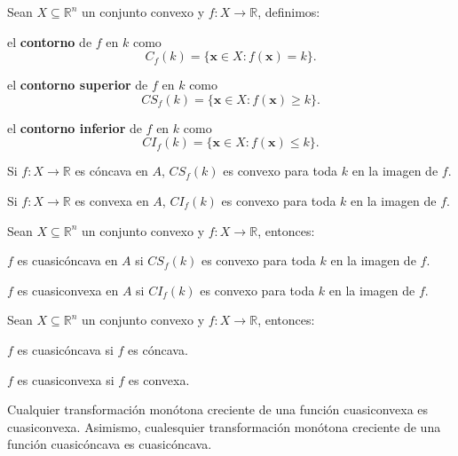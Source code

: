 \documentclass[8pt,a4paper]{extarticle}
\begin{document}
\begin{multicols}{3}
	\begin{boxdef}
		Sean $X \subseteq \mathbb{R}^n$ un conjunto convexo y $f : X \to \mathbb{R}$, definimos:
		\begin{bulletlist}
			\item el \textbf{contorno} de $f$ en $k$ como $$C_f(k) = \{\mathbf{x} \in X : f(\mathbf{x}) = k\}.$$
			\item el \textbf{contorno superior} de $f$ en $k$ como $$CS_f(k) = \{\mathbf{x} \in X : f(\mathbf{x}) \ge k\}.$$
			\item el \textbf{contorno inferior} de $f$ en $k$ como $$CI_f(k) = \{\mathbf{x} \in X : f(\mathbf{x}) \le k\}.$$
		\end{bulletlist}
	\end{boxdef}

	\begin{boxtheo}[]
		\begin{eqlist}
			\item Si $f : X \to \mathbb{R}$ es cóncava en $A$, $CS_f(k)$ es convexo para toda $k$ en la imagen de $f$.
			\item Si $f : X \to \mathbb{R}$ es convexa en $A$, $CI_f(k)$ es convexo para toda $k$ en la imagen de $f$.
		\end{eqlist}
	\end{boxtheo}

	\begin{boxtheo}[]
		Sean $X \subseteq \mathbb{R}^n$ un conjunto convexo y $f : X \to \mathbb{R}$, entonces:
		\begin{eqlist}
			\item $f$ es cuasicóncava en $A$ si $CS_f (k)$ es convexo para toda $k$ en la imagen de $f$.
			\item $f$ es cuasiconvexa en $A$ si $CI_f (k)$ es convexo para toda $k$ en la imagen de $f$.
		\end{eqlist}
	\end{boxtheo}

	\begin{boxtheo}[]
		Sean $X \subseteq \mathbb{R}^n$ un conjunto convexo y $f : X \to \mathbb{R}$, entonces:
		\begin{eqlist}
			\item $f$ es cuasicóncava si $f$ es cóncava.
			\item $f$ es cuasiconvexa si $f$ es convexa.
		\end{eqlist}
	\end{boxtheo}

	\begin{boxtheo}[]
		Cualquier transformación monótona creciente de una función cuasiconvexa es cuasiconvexa. Asimismo, cualesquier transformación monótona creciente de una función cuasicóncava es cuasicóncava.
	\end{boxtheo}


\end{multicols}
\end{document}
